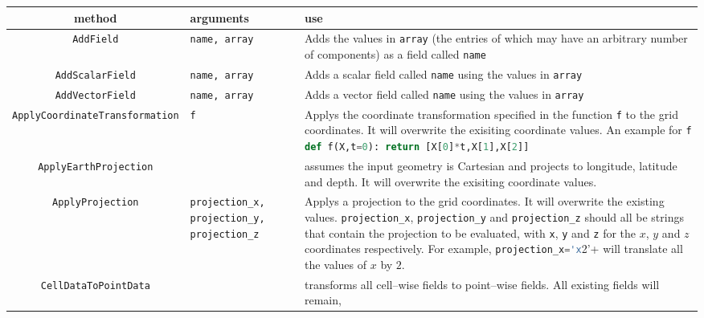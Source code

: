 \begin{landscape}
\begin{longtable}{|c | p{} |p{}|}
\hline
\centering
  method & arguments & use \\ \hline
\lstinline[language=Python]+AddField+ & \lstinline[language=Python]+name, array+ & Adds the values in \lstinline[language=Python]+array+ (the entries of which may have an arbitrary number of components) as a field called \lstinline[language=Python]+name+ \\ \hline
%
\lstinline[language=Python]+AddScalarField+ & \lstinline[language=Python]+name, array+ & Adds a scalar field called \lstinline[language=Python]+name+ using the values in \lstinline[language=Python]+array+ \\ \hline
%
\lstinline[language=Python]+AddVectorField+ & \lstinline[language=Python]+name, array+ & Adds a vector field called \lstinline[language=Python]+name+ using the values in \lstinline[language=Python]+array+ \\ \hline
%
\lstinline[language=Python]+ApplyCoordinateTransformation+ & \lstinline[language=Python]+f+ & Applys the coordinate transformation specified in the function \lstinline[language=Python]+f+ to the grid coordinates. It will overwrite the exisiting coordinate values. An example for \lstinline[language=Python]+f+  \lstinline[language=Python]+def f(X,t=0): return [X[0]*t,X[1],X[2]]+ \\ \hline
%
\lstinline[language=Python]+ApplyEarthProjection+ & & assumes the input geometry is Cartesian and projects to longitude, latitude and depth. It will overwrite the exisiting coordinate values. \\ \hline
%
\lstinline[language=Python]+ApplyProjection+ & \lstinline[language=Python]+projection_x,+ \lstinline[language=Python]+projection_y,+ \lstinline[language=Python]+projection_z+ & Applys a projection to the grid coordinates. It will overwrite the existing values. \lstinline[language=Python]+projection_x+, \lstinline[language=Python]+projection_y+ and \lstinline[language=Python]+projection_z+ should all be strings that contain the projection to be evaluated, with \lstinline[language=Python]+x+, \lstinline[language=Python]+y+ and \lstinline[language=Python]+z+ for the $x$, $y$ and $z$ coordinates respectively. For example,  \lstinline[language=Python]+projection_x='x+2'+ will translate all the values of $x$ by $2$. \\ \hline
%
\lstinline[language=Python]+CellDataToPointData+ & & transforms all cell--wise fields to point--wise fields. All existing fields will remain, \\ \hline

\end{longtable}
\end{landscape}

